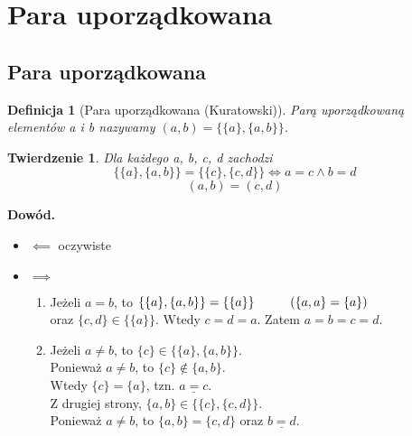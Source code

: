 \documentclass[a5paper,8pt]{article}
\theoremstyle{mythmstyle}
\newtheorem{definition}{Definicja}[section]
\newtheorem{theorem}{Twierdzenie}[section]
\newcommand\tab[1][1cm]{\hspace*{#1}}
\begin{document}
        \pagebreak
        \section{Para uporządkowana} %
        \label{sec:para_uporządkowana}

        \subsection{Para uporządkowana} %
        \label{sub:para_uporządkowana}
        

            \begin{definition}[Para uporządkowana (Kuratowski)]
                Parą uporządkowaną elementów a i b nazywamy $ (a, b) = \{ \{a\}, \{a, b\} \} $.
            \end{definition}

            \begin{theorem}
                Dla każdego a, b, c, d zachodzi
                \begin{equation*}
                    \{ \{a\}, \{a, b\} \} = \{ \{c\}, \{c, d\} \} \iff a = c \wedge b = d
                \end{equation*}
                \begin{equation*}
                    (a, b) = (c, d)
                \end{equation*}
            \end{theorem}

            \textbf{Dowód.}
            \begin{itemize}
                \item $ \impliedby $ oczywiste
                \item $ \implies $
                    \begin{enumerate}
                        \item Jeżeli $ a = b $, to $ \{ \{a\}, \{a, b\} \} = \{ \{a\} \}\tab (\{a, a\} = \{a\} )$ \\
                              oraz $ \{c, d\} \in \{ \{a\} \} $. Wtedy $ c = d = a $. Zatem $ a = b = c =d $.

                        \item Jeżeli $ a \neq b $, to $ \{c\} \in \{ \{a\}, \{a, b\} \} $. \\
                              Ponieważ $ a \neq b $, to $ \{c\} \notin \{a, b\} $. \\
                              Wtedy $ \{c\} =  \{a\} $, tzn. $ \underline{a = c} $. \\
                              Z drugiej strony, $ \{a, b\} \in \{ \{c\}, \{c, d\} \} $.\\
                              Ponieważ $ a \neq b $, to $ \{a, b\} = \{c, d\} $ oraz $ \underline{b = d} $.
                    \end{enumerate}
            \end{itemize}
\end{document}
